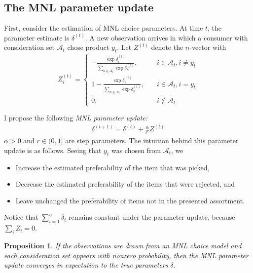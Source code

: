 \documentclass[preprint,12pt,authoryear]{elsarticle}
\newtheorem{proposition}{Proposition}
\begin{document}
\subsection{The MNL parameter update}
First, consider the estimation of MNL choice parameters. At time $t$, the parameter estimate is $\delta^{(t)}$. A new observation arrives in which a consumer with consideration set $\mathcal{A}_t$ chose product $y_t$. Let $Z^{(t)}$ denote the $n$-vector with
\begin{equation}Z^{(t)}_i =
\begin{cases}
 - \frac{\exp \delta^{(t)}_i}{\sum_{h\in \mathcal{A}_t} \exp \delta^{(t)}_h}, \quad& i \in \mathcal{A}_t, i\neq y_t \\
1 - \frac{\exp \delta^{(t)}_i}{\sum_{h\in \mathcal{A}_t} \exp \delta^{(t)}_h} , \quad& i \in \mathcal{A}_t, i =  y_t \\
0, \quad & i \notin \mathcal{A}_t
\end{cases}
\end{equation}

I propose the following \emph{MNL parameter update:}
\begin{align} \label{mnlparameterupdate}
\delta^{(t+1)} = \delta^{(t)} + \frac{\alpha}{t^r} Z^{(t)}
\end{align}
$\alpha >0$ and $r \in (0, 1]$ are step parameters. The intuition behind this parameter update is as follows. Seeing that $y_t$ was chosen from $\mathcal{A}_t$, we 
\begin{itemize}
\item Increase the estimated preferability of the item that was picked,
\item Decrease the estimated preferability of the items that were rejected, and
\item Leave unchanged the preferability of items not in the presented assortment.
\end{itemize}
Notice that $\sum_{i=1}^n \delta_i$ remains constant under the parameter update, because $\sum_i Z_i = 0$. 

\begin{proposition}If the observations are drawn from an MNL choice model and each consideration set appears with nonzero probability, then the MNL parameter update converges in expectation to the true parameters $\delta$.
\end{proposition}
\end{document}
